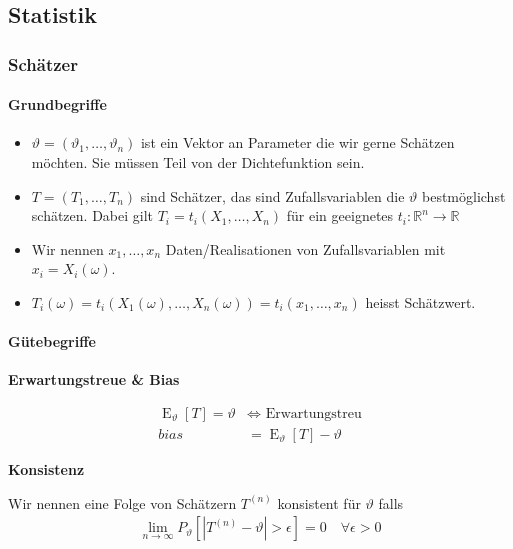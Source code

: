 \documentclass[25pt]{sciposter}
\newcommand{\R}{\mathbb{R}}
\newcommand{\E}{\operatorname{E}}
\newenvironment{method}[1]{\begin{mdframed}[backgroundcolor=blue!10,innertopmargin=15pt, innerbottommargin=15pt,nobreak=true]
		\textbf{#1 }
	}
	{ 
	\end{mdframed}
}
\begin{document}
\begin{multicols}{3}
\part{Statistik}

\section{Schätzer}
\subsection*{Grundbegriffe}

\begin{itemize}
	\item $\vartheta =  (\vartheta_1,\ldots,\vartheta_n)$ ist ein Vektor an Parameter die wir gerne Schätzen möchten. Sie müssen Teil von der Dichtefunktion sein.
	\item $T = (T_1,\ldots,T_n)$ sind Schätzer, das sind Zufallsvariablen die $\vartheta$ bestmöglichst schätzen. Dabei gilt $T_i = t_i(X_1,\ldots,X_n)$ für ein geeignetes $t_i:\R^n \to \R$
	\item Wir nennen $x_1,\ldots,x_n$ Daten/Realisationen von Zufallsvariablen mit $x_i = X_i(\omega)$.
	\item $T_i(\omega) = t_i(X_1(\omega), \ldots, X_n(\omega)) = t_i(x_1,\ldots,x_n) $ heisst Schätzwert.
\end{itemize}

\subsection*{Gütebegriffe}

\begin{method}{Erwartungstreue \& Bias}
	\begin{align*}
	\E_\vartheta[T] = \vartheta &\iff \text{ Erwartungstreu}\\
	bias &= \E_\vartheta[T] - \vartheta
	\end{align*}
\end{method}

\begin{method}{Konsistenz}
	Wir nennen eine Folge von Schätzern $T^{(n)}$ konsistent für $\vartheta$ falls
	\begin{align*}
\lim_{n\to\infty} P_\vartheta [|T^{(n)} - \vartheta| > \epsilon] = 0 \quad \forall \epsilon > 0
	\end{align*}
\end{method}




\end{multicols}
\end{document}
